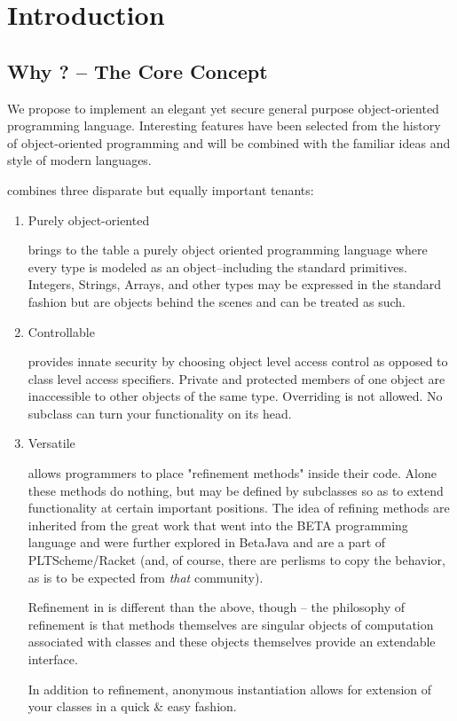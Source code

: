 \section{Introduction}
\subsection{Why \Lang{}? -- The Core Concept}
We propose to implement an elegant yet secure general purpose object-oriented programming language. Interesting features have been selected from the history of object-oriented programming and will be combined with the familiar ideas and style of modern languages.

\Lang{} combines three disparate but equally important tenants:

\begin{enumerate}
\item Purely object-oriented 

\Lang{} brings to the table a purely object oriented programming language where every type is modeled as an object--including the standard primitives. Integers, Strings, Arrays, and other types may be expressed in the standard fashion but are objects behind the scenes and can be treated as such.

\item Controllable

\Lang{} provides innate security by choosing object level access control as opposed to class level access specifiers. Private and protected members of one object are inaccessible to other objects of the same type. Overriding is not allowed. No subclass can turn your functionality on its head.

\item Versatile

\Lang{} allows programmers to place "refinement methods" inside their code. Alone these methods do nothing, but may be defined by subclasses so as to extend functionality at certain important positions. The idea of refining methods are inherited from the great work that went into the BETA programming language and were further explored in BetaJava and are a part of PLTScheme/Racket (and, of course, there are perlisms to copy the behavior, as is to be expected from \emph{that} community).

Refinement in \Lang{} is different than the above, though -- the \Lang{} philosophy of refinement is that methods themselves are singular objects of computation associated with classes and these objects themselves provide an extendable interface.

In addition to refinement, anonymous instantiation allows for extension of your classes in a quick \& easy fashion.
\end{enumerate}

